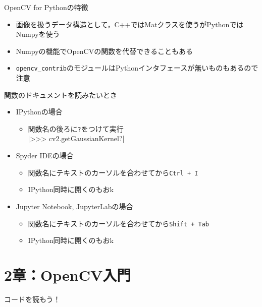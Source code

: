 \documentclass[10pt]{beamer}
\begin{document}
	\begin{frame}{OpenCV for Pythonの特徴}
	    \begin{itemize}
	        \item 画像を扱うデータ構造として，C++ではMatクラスを使うがPythonではNumpyを使う
	        \item Numpyの機能でOpenCVの関数を代替できることもある
	        \item \texttt{opencv\_contrib}のモジュールはPythonインタフェースが無いものもあるので注意
	    \end{itemize}
	\end{frame}
	
	\begin{frame}[fragile]{関数のドキュメントを読みたいとき}
	    \begin{itemize}
	        \item IPythonの場合
	            \begin{itemize}
	                \item 関数名の後ろに\texttt{?}をつけて実行 \\
	                |>>> cv2.getGaussianKernel?|
	            \end{itemize}
            \item Spyder IDEの場合
	            \begin{itemize}
	                \item 関数名にテキストのカーソルを合わせてから\texttt{Ctrl + I}
	                \item IPython同時に開くのもおk
	            \end{itemize}
	        \item Jupyter Notebook, JupyterLabの場合
	            \begin{itemize}
	                \item 関数名にテキストのカーソルを合わせてから\texttt{Shift + Tab}
	                \item IPython同時に開くのもおk
	            \end{itemize}
	    \end{itemize}
	\end{frame}
	
	\section{2章：OpenCV入門}
	
    \begin{frame}[plain]
        \begin{center}{\LARGE コードを読もう！}\end{center}
	\end{frame}
	
\end{document}

